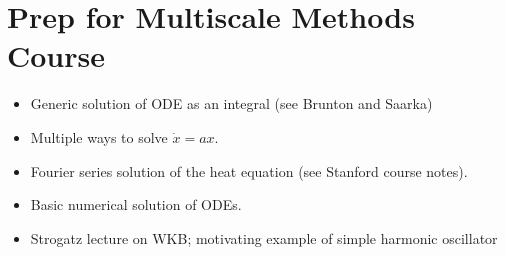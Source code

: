 \documentclass[12pt]{article}
\begin{document}
\section{Prep for Multiscale Methods Course}
\begin{itemize}
\item Generic solution of ODE as an integral (see Brunton and Saarka)
\item Multiple ways to solve $\dot{x} = ax$. 
\item Fourier series solution of the heat equation (see Stanford course notes). 
\item Basic numerical solution of ODEs. 
\item Strogatz lecture on WKB; motivating example of simple harmonic oscillator
\end{itemize}
\end{document}
